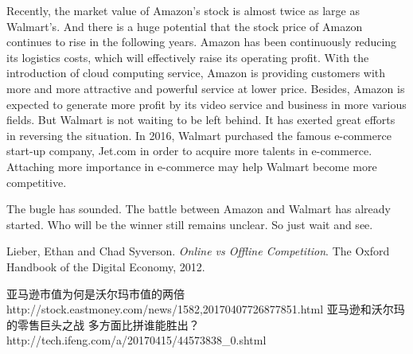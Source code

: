 \documentclass[paper=a4, fontsize=11pt]{article}
\begin{document}
Recently, the market value of Amazon’s stock is almost twice as large as Walmart’s. And there is a huge potential that the stock price of Amazon continues to rise in the following years. Amazon has been continuously reducing its logistics costs, which will effectively raise its operating profit. With the introduction of cloud computing service, Amazon is providing customers with more and more attractive and powerful service at lower price. Besides, Amazon is expected to generate more profit by its video service and business in more various fields. But Walmart is not waiting to be left behind. It has exerted great efforts in reversing the situation. In 2016, Walmart purchased the famous e-commerce start-up company, Jet.com in order to acquire more talents in e-commerce. Attaching more importance in e-commerce may help Walmart become more competitive.  

The bugle has sounded. The battle between Amazon and Walmart has already started. Who will be the winner still remains unclear. So just wait and see.

\begin{thebibliography}{99}
Lieber, Ethan and Chad Syverson. 
\textit{Online vs Offline Competition}. 
The Oxford Handbook of the Digital Economy, 2012.
\begin{CJK}{UTF8}{gkai}
亚马逊市值为何是沃尔玛市值的两倍 \\
http://stock.eastmoney.com/news/1582,20170407726877851.html
亚马逊和沃尔玛的零售巨头之战 多方面比拼谁能胜出？\\
http://tech.ifeng.com/a/20170415/44573838\_0.shtml
\end{CJK}
\end{thebibliography}
\end{document}
